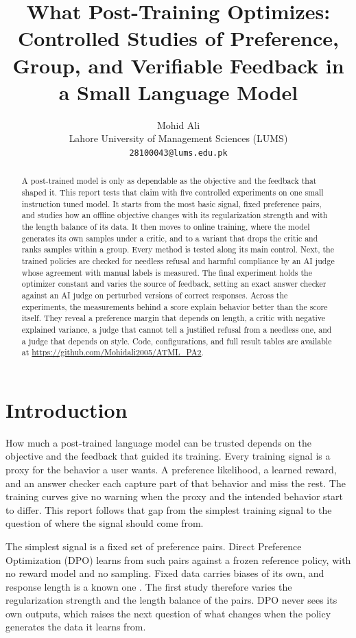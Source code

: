 \documentclass{article}
\title{What Post-Training Optimizes: Controlled Studies of Preference, Group, and Verifiable Feedback in a Small Language Model}
\author{
  Mohid Ali \\
  Lahore University of Management Sciences (LUMS) \\
  \texttt{28100043@lums.edu.pk}
}
\begin{document}
\maketitle

\begin{abstract}
A post-trained model is only as dependable as the objective and the feedback
that shaped it. This report tests that claim with five controlled experiments on
one small instruction tuned model. It starts from the most basic signal, fixed
preference pairs, and studies how an offline objective changes with its
regularization strength and with the length balance of its data. It then moves
to online training, where the model generates its own samples under a critic,
and to a variant that drops the critic and ranks samples within a group. Every
method is tested along its main control. Next, the trained policies are checked
for needless refusal and harmful compliance by an AI judge whose agreement with
manual labels is measured. The final experiment holds the optimizer constant and
varies the source of feedback, setting an exact answer checker against an AI
judge on perturbed versions of correct responses. Across the experiments, the
measurements behind a score explain behavior better than the score itself. They
reveal a preference margin that depends on length, a critic with negative
explained variance, a judge that cannot tell a justified refusal from a needless
one, and a judge that depends on style. Code, configurations, and full result tables are
available at \url{https://github.com/Mohidali2005/ATML_PA2}.
\end{abstract}

\section{Introduction}
\label{sec:intro}

How much a post-trained language model can be trusted depends on the objective
and the feedback that guided its training. Every training signal is a proxy for
the behavior a user wants. A preference likelihood, a learned reward, and an
answer checker each capture part of that behavior and miss the rest. The
training curves give no warning when the proxy and the intended behavior start
to differ. This report follows that gap from the simplest training signal to the question of
where the signal should come from.

The simplest signal is a fixed set of preference pairs. Direct Preference
Optimization (DPO) \citep{rafailov2023direct} learns from such pairs against a
frozen reference policy, with no reward model and no sampling. Fixed data carries
biases of its own, and response length is a known one
\citep{singhal2023long,park2024disentangling}. The first study therefore varies
the regularization strength and the length balance of the pairs. DPO never sees
its own outputs, which raises the next question of what changes when the policy
generates the data it learns from.
\end{document}
